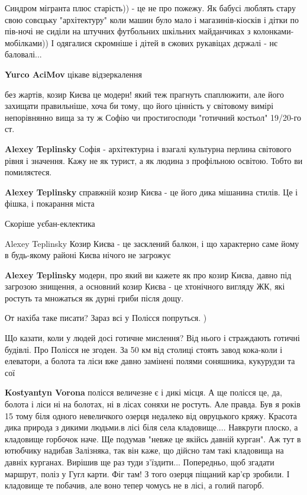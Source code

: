 \begin{itemize}
Синдром мігранта плюс старість)) - це не про пожежу.
Як бабусі люблять стару свою совєцьку "архітектуру" коли машин було мало і магазинів-кіосків і дітки по пів-ночі не сиділи на штучних футбольних шкільних майданчиках з колонками-мобілками))
І одягалися скромніше і дітей в єжових рукавіцах дєржалі - нє баловалі...

\begin{itemize} %
\textbf{Yurco AciMov} цікаве відзеркалення
\end{itemize} %


без жартів, козир Києва це модерн! який теж прагнуть спаплюжити, але його
захищати правильніше, хоча би тому, що його цінність у світовому вимірі
непорівнянно вища за ту ж Софію чи простигосподи "готичний костьол" 19/20-го
ст.

\begin{itemize} %
\textbf{Alexey Teplinsky} Софія - архітектурна і взагалі культурна перлина світового рівня і значення. Кажу не як турист, а як людина з профільною освітою. Тобто ви помиляєтеся.

\textbf{Alexey Teplinsky} справжній козир Києва - це його дика мішанина стилів. Це і фішка, і покарання міста

Скоріше уєбан-еклектика

Alexey Teplinsky Козир Києва - це засклений балкон, і що характерно саме йому в будь-якому районі Києва нічого не загрожує

\textbf{Alexey Teplinsky} модерн, про який ви кажете як про козир Києва, давно під загрозою знищення, а основний козир Києва - це хтонічного вигляду ЖК, які ростуть та множаться як дурні гриби після дощу.
\end{itemize} %

От нахіба таке писати? Зараз всі у Полісся попруться. )

Що казати, коли у людей досі готичне мислення? Від нього і страждають готичні будівлі.
Про Полісся не згоден. За 50 км від столиці стоять завод кока-коли і елеватори, а болота та ліси вже давно замінені полями соняшника, кукурудзи та сої

\begin{itemize} %
\textbf{Kostyantyn Vorona} полісся величезне є і дикі місця. А ще полісся це, да, болота і ліси ні на болотах, ні в лісах соняхи не ростуть. Але правда. Був я років 15 тому біля одного невеличкого озерця недалеко від овруцького кряжу. Красота дика природа з дикими людьми.в лісі біля села кладовище.... Навкруги плоско, а кладовище горбочок наче. Ще подумав "невже це якійсь давній курган". Аж тут в ютюбчику надибав Залізняка, так він каже, що дійсно там такі кладовища на давніх курганах. Вирішив ще раз туди з'їздити... Попередньо, щоб згадати маршрут, поліз у Гугл карти. Фіг там! З того озерця піщаний кар'єр зробили. І кладовище те побачив, але воно тепер чомусь не в лісі, а голий пагорб.
\end{itemize} %


\end{itemize}
